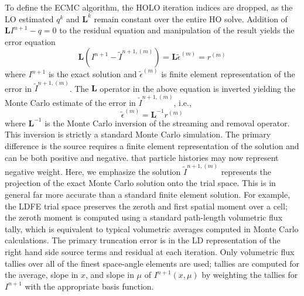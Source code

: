 \documentclass{mc2013}
\newcommand{\B}[1]{\ensuremath{\mathbf{#1}}}
\begin{document}
To define the ECMC algorithm, the HOLO iteration indices
are dropped, as the LO estimated $q^{k}$ and $\B L^{k}$ remain constant over the entire HO solve.
Addition of $\B L I^{n+1} - q=0$ to the residual equation 
and manipulation of the result yields the error equation
\begin{equation}
    \B L (I^{n+1} - \tilde{I}^{n+1,(m)}) = \B L \tilde{\epsilon}^{(m)} = r^{(m)}
\end{equation}
where $I^{n+1}$ is the exact solution and $\tilde{\epsilon}^{(m)}$ is finite element
representation of the error in
$\tilde{I}^{n+1,(m)}$. The $\B L$ operator in the above equation is inverted yielding the Monte Carlo
estimate of the error in $\tilde{I}^{n+1,(m)}$, i.e., 
\begin{equation}
\tilde{\epsilon}^{(m)} = \B L^{-1} r^{(m)}
\end{equation}
where $\B L^{-1}$ is the Monte Carlo inversion of the streaming and removal operator.
This inversion is strictly a standard Monte Carlo simulation.  The primary difference
is the source requires a finite element representation of the solution and can be
both positive and negative.  
that particle histories may now represent negative weight. 
Here, we emphasize the solution $\tilde{I}^{n+1,(m)}$ represents the projection of the exact Monte Carlo
solution onto the trial space.  This is in general far more accurate than a standard finite element solution.
For example, the LDFE trial space preserves the zeroth and first spatial moment over a
cell; the zeroth moment is computed using a standard path-length volumetric flux tally, which
is equivalent to typical volumetric averages computed in Monte Carlo calculations.  The primary truncation error is in the LD
representation of the right hand side source terms and residual at each
iteration.  Only volumetric flux tallies over all of the finest space-angle
elements are used; tallies are computed for the average, slope in $x$, and slope in $\mu$ of
$I^{n+1}(x,\mu)$ by weighting the tallies for $I^{n+1}$ with the appropriate basis
function. 
\end{document}

